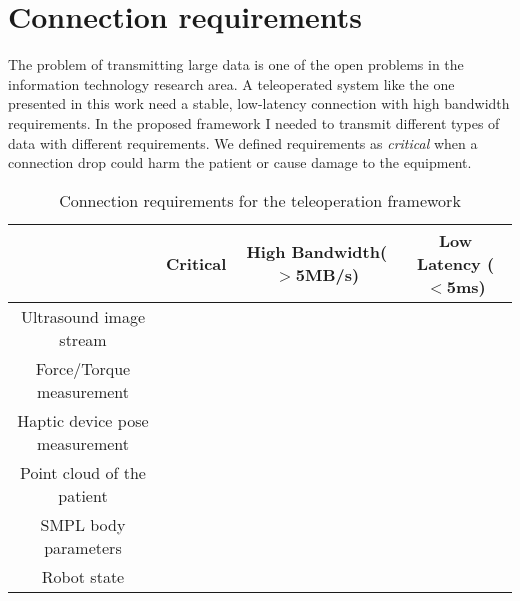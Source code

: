 \newpage
\chapter{Connection requirements}

The problem of transmitting large data is one of the open problems in the information technology research area. A teleoperated system like the one presented in this work need a stable, low-latency connection with high bandwidth requirements. In the proposed framework I needed to transmit different types of data with different requirements. We defined requirements as \textit{critical} when a connection drop could harm the patient or cause damage to the equipment.
\newcommand{\cmark}{\ding{51}}%
\newcommand{\xmark}{\ding{55}}%

\begin{table*}[!ht]
	\centering

	\begin{tabular}{|c|c|c|c|}
		\hline
		& Critical & High Bandwidth($>$5MB/s) & Low Latency ($<$5ms)\\
		\hline
		Ultrasound image stream & \xmark & \cmark & \cmark \\
		\hline
		Force/Torque measurement & \cmark & \xmark & \cmark \\
		\hline
		Haptic device pose measurement & \cmark & \xmark & \cmark \\
		\hline
		Point cloud of the patient & \xmark & \cmark & \xmark \\
		\hline
		SMPL body parameters  & \xmark & \xmark & \cmark \\
		\hline
		Robot state & \xmark & \xmark & \cmark \\
		\hline
	\end{tabular}
	\caption{Connection requirements for the teleoperation framework}
	\label{tab:comparison}
\end{table*}
